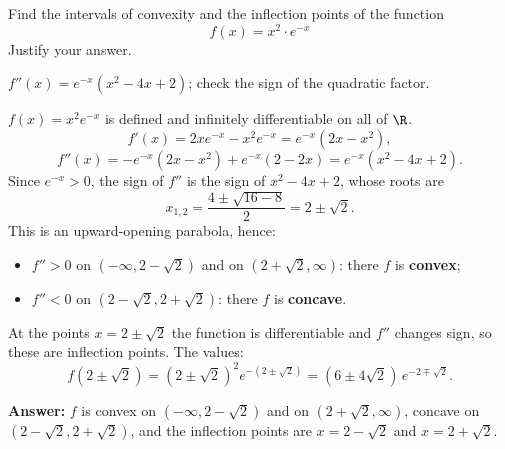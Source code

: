 
\begin{question}
Find the intervals of convexity and the inflection points of the function
\[ f(x) = x^2 \cdot e^{-x} \]
Justify your answer.
\end{question}

\begin{hint}
$f''(x) = e^{-x}(x^2 - 4x + 2)$; check the sign of the quadratic factor.
\end{hint}

\begin{solution}
$f(x) = x^2 e^{-x}$ is defined and infinitely differentiable on all of $\R$.
\[ f'(x) = 2xe^{-x} - x^2e^{-x} = e^{-x}(2x - x^2), \]
\[ f''(x) = -e^{-x}(2x - x^2) + e^{-x}(2 - 2x) = e^{-x}(x^2 - 4x + 2). \]
Since $e^{-x} > 0$, the sign of $f''$ is the sign of $x^2 - 4x + 2$, whose roots are
\[ x_{1,2} = \frac{4 \pm \sqrt{16 - 8}}{2} = 2 \pm \sqrt2. \]
This is an upward-opening parabola, hence:
\begin{itemize}
  \item $f'' > 0$ on $(-\infty, 2 - \sqrt2)$ and on $(2 + \sqrt2, \infty)$: there $f$ is \textbf{convex};
  \item $f'' < 0$ on $(2 - \sqrt2, 2 + \sqrt2)$: there $f$ is \textbf{concave}.
\end{itemize}
At the points $x = 2 \pm \sqrt2$ the function is differentiable and $f''$ changes sign, so these are inflection points. The values:
\[ f(2 \pm \sqrt2) = (2 \pm \sqrt2)^2 e^{-(2 \pm \sqrt2)} = (6 \pm 4\sqrt2)\,e^{-2 \mp \sqrt2}. \]

\textbf{Answer:} $f$ is convex on $(-\infty, 2 - \sqrt2)$ and on $(2 + \sqrt2, \infty)$, concave on $(2 - \sqrt2, 2 + \sqrt2)$, and the inflection points are $x = 2 - \sqrt2$ and $x = 2 + \sqrt2$.
\end{solution}
